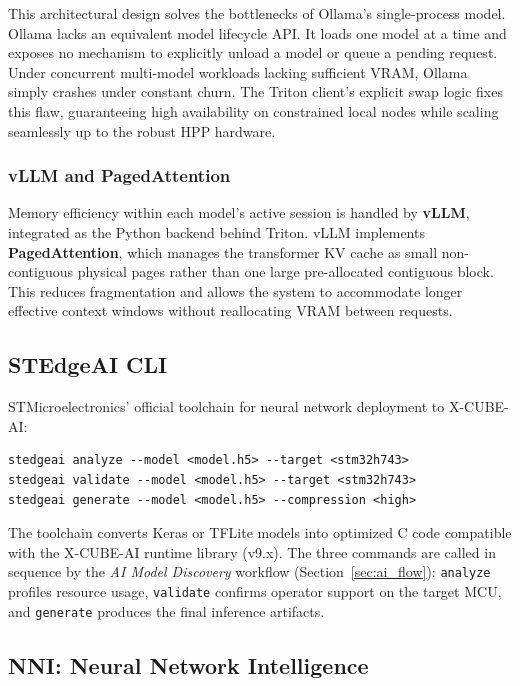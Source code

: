 This architectural design solves the bottlenecks of Ollama's single-process model. Ollama lacks an equivalent model lifecycle API. It loads one model at a time and exposes no mechanism to explicitly unload a model or queue a pending request. Under concurrent multi-model workloads lacking sufficient VRAM, Ollama simply crashes under constant churn. The Triton client's explicit swap logic fixes this flaw, guaranteeing high availability on constrained local nodes while scaling seamlessly up to the robust HPP hardware.


\subsubsection{vLLM and PagedAttention}

Memory efficiency within each model's active session is handled by \textbf{vLLM}, integrated as the Python backend behind Triton. vLLM implements \textbf{PagedAttention}, which manages the transformer KV cache as small non-contiguous physical pages rather than one large pre-allocated contiguous block. This reduces fragmentation and allows the system to accommodate longer effective context windows without reallocating VRAM between requests.


\subsection{STEdgeAI CLI}

STMicroelectronics' official toolchain for neural network deployment to X-CUBE-AI:

\begin{verbatim}
stedgeai analyze --model <model.h5> --target <stm32h743>
stedgeai validate --model <model.h5> --target <stm32h743>
stedgeai generate --model <model.h5> --compression <high>
\end{verbatim}

The toolchain converts Keras or TFLite models into optimized C code compatible with the X-CUBE-AI runtime library (v9.x). The three commands are called in sequence by the \textit{AI Model Discovery} workflow (Section~\ref{sec:ai_flow}): \texttt{analyze} profiles resource usage, \texttt{validate} confirms operator support on the target MCU, and \texttt{generate} produces the final inference artifacts.

\subsection{NNI: Neural Network Intelligence}


